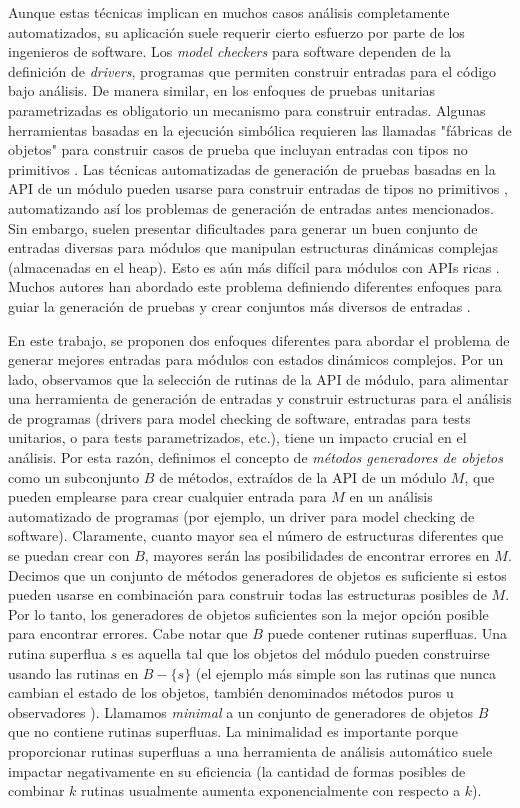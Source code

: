 Aunque estas técnicas implican en muchos casos análisis completamente automatizados, su aplicación suele requerir cierto esfuerzo por parte de los ingenieros de software. Los \emph{model checkers} para software dependen de la definición de \emph{drivers}, programas que permiten construir entradas para el código bajo análisis. De manera similar, en los enfoques de pruebas unitarias parametrizadas \cite{Tillmann:2010} es obligatorio un mecanismo para construir entradas. Algunas herramientas basadas en la ejecución simbólica requieren las llamadas "fábricas de objetos" para construir casos de prueba que incluyan entradas con tipos no primitivos \cite{Tillmann:2008}. Las técnicas automatizadas de generación de pruebas basadas en la API de un módulo pueden usarse para construir entradas de tipos no primitivos \cite{Pacheco07, Fraser11}, automatizando así los problemas de generación de entradas antes mencionados. Sin embargo, suelen presentar dificultades para generar un buen conjunto de entradas diversas para módulos que manipulan estructuras dinámicas complejas (almacenadas en el heap). Esto es aún más difícil para módulos con APIs ricas \cite{Ponzio:2018}. Muchos autores han abordado este problema definiendo diferentes enfoques para guiar la generación de pruebas y crear conjuntos más diversos de entradas \cite{Ponzio:2018, Ciupa:2008}.

En este trabajo, se proponen dos enfoques diferentes para abordar el problema de generar mejores entradas para módulos con estados dinámicos complejos. Por un lado, observamos que la selección de rutinas de la API de módulo, para alimentar una herramienta de generación de entradas y construir estructuras para el análisis de programas (drivers para model checking de software, entradas para tests unitarios, o para tests parametrizados, etc.), tiene un impacto crucial en el análisis. Por esta razón, definimos el concepto de \emph{métodos generadores de objetos} como un subconjunto \(B\) de métodos, extraídos de la API de un módulo \(M\), que pueden emplearse para crear cualquier entrada para \(M\) en un análisis automatizado de programas  (por ejemplo, un driver para model checking de software). 
Claramente, cuanto mayor sea el número de estructuras diferentes que se puedan crear con \(B\), mayores serán las posibilidades de encontrar errores en \(M\). Decimos que un conjunto de métodos generadores de objetos es suficiente si estos pueden usarse en combinación para construir todas las estructuras posibles de \(M\). Por lo tanto, los generadores de objetos suficientes son la mejor opción posible para encontrar errores. Cabe notar que \(B\) puede contener rutinas superfluas. Una rutina superflua \(s\) es aquella tal que los objetos del módulo pueden construirse usando las rutinas en $B - \{s\}$ (el ejemplo más simple son las rutinas que nunca cambian el estado de los objetos, también denominados métodos puros u observadores \cite{}). Llamamos \emph{minimal} a un conjunto de generadores de objetos \(B\) que no contiene rutinas superfluas. La minimalidad es importante porque proporcionar rutinas superfluas a una herramienta de análisis automático suele impactar negativamente en su eficiencia (la cantidad de formas posibles de combinar \(k\) rutinas usualmente aumenta exponencialmente con respecto a \(k\)). 

